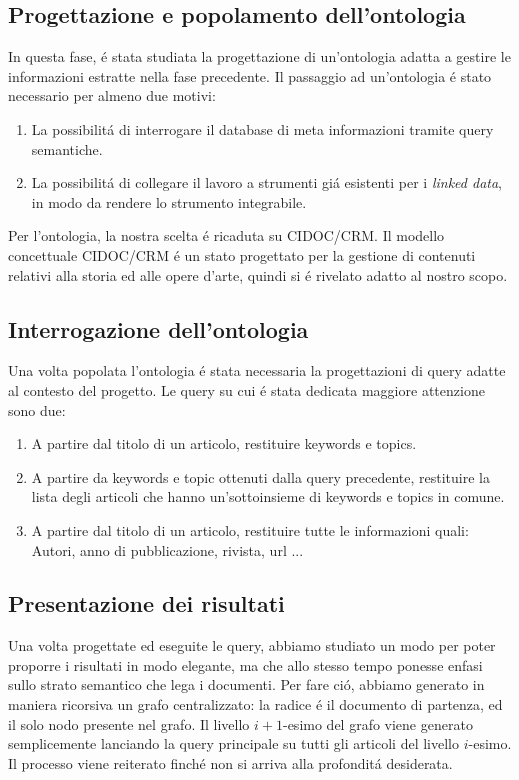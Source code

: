 \documentclass[11pt,a4paper]{article}
\begin{document}
\subsection{Progettazione e popolamento dell'ontologia}
\label{subsec:ontology}
In questa fase, \'e stata studiata la progettazione di un'ontologia adatta a gestire le informazioni estratte nella fase precedente. Il passaggio ad un'ontologia \'e stato necessario per almeno due motivi:
\begin{enumerate}
	\item La possibilit\'a di interrogare il database di meta informazioni tramite query semantiche.
	\item La possibilit\'a di collegare il lavoro a strumenti gi\'a esistenti per i \emph{linked data}, in modo da rendere lo strumento integrabile.
\end{enumerate}
Per l'ontologia, la nostra scelta \'e ricaduta su CIDOC/CRM\cite{CIDOC}. Il modello concettuale CIDOC/CRM \'e un stato progettato per la gestione di contenuti relativi alla storia ed alle opere d'arte, quindi si \'e rivelato adatto al nostro scopo. 


\subsection{Interrogazione dell'ontologia}
\label{subsec:query}
Una volta popolata l'ontologia \'e stata necessaria la progettazioni di query adatte al contesto del progetto. Le query su cui \'e stata dedicata maggiore attenzione sono due:
\begin{enumerate}
	\item A partire dal titolo di un articolo, restituire  keywords e topics.
	\item A partire da keywords e topic ottenuti dalla query precedente, restituire la lista degli articoli che hanno un'sottoinsieme di keywords e topics in comune. 
	\item A partire dal titolo di un articolo, restituire tutte le informazioni quali: Autori, anno di pubblicazione, rivista, url ...
\end{enumerate}

\subsection{Presentazione dei risultati}
\label{subsec:results}

Una volta progettate ed eseguite le query, abbiamo studiato un modo per poter proporre i risultati in modo elegante, ma che allo stesso tempo ponesse enfasi sullo strato semantico che lega i documenti. Per fare ci\'o, abbiamo generato in maniera ricorsiva un grafo centralizzato: la radice \'e il documento di partenza, ed il solo nodo presente nel grafo. Il livello $i+1$-esimo del grafo viene generato semplicemente lanciando la query principale su tutti gli articoli del livello $i$-esimo. Il processo viene reiterato finch\'e non si arriva alla profondit\'a desiderata.
\end{document}
